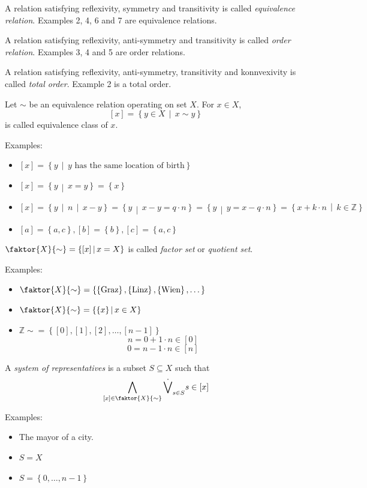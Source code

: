 \documentclass[a4paper,landscape,twocolumn]{article}
\newcommand\set[1]{\left\{#1\right\}}
\newcommand\setdef[2]{\left\{#1\,\middle|\,#2\right\}}
\newcommand\divides[2]{#1\,\mid\,#2}
\begin{document}
A relation satisfying reflexivity, symmetry and transitivity is called \emph{equivalence relation}.
Examples 2, 4, 6 and 7 are equivalence relations.

A relation satisfying reflexivity, anti-symmetry and transitivity is called \emph{order relation}.
Examples 3, 4 and 5 are order relations.

A relation satisfying reflexivity, anti-symmetry, transitivity and konnvexivity is called \emph{total order}.
Example 2 is a total order.

Let $\sim$ be an equivalence relation operating on set $X$.
For $x \in X$,
\[ [x] = \setdef{y \in X}{x \sim y} \]
is called equivalence class of $x$.

Examples:
\begin{itemize}
  \item $[x] = \setdef{y}{y \text{ has the same location of birth}}$
  \item $[x] = \setdef{y}{x = y} = \set{x}$
  \item $[x] = \setdef{y}{\divides{n}{x - y}} = \setdef{y}{x - y = q\cdot n} = \setdef{y}{y = x - q \cdot n} = \setdef{x + k \cdot n}{k \in \mathbb{Z}}$
  \item $[a] = \set{a, c}, [b] = \set{b}, [c] = \set{a, c}$
\end{itemize}

$\faktor{X}{\sim} = \setdef{[x]}{x = X}$ is called \emph{factor set} or \emph{quotient set}.

Examples:
\begin{itemize}
  \item $\faktor{X}{\sim} = \set{\set{\text{Graz}}, \set{\text{Linz}}, \set{\text{Wien}}, \dots}$
  \item $\faktor{X}{\sim} = \setdef{\set{x}}{x \in X}$
  \item $\mathbb{Z}{\sim} = \set{[0], [1], [2], \ldots, [n-1]}$
     \[ n = 0 + 1 \cdot n \in [0] \]
     \[ 0 = n - 1 \cdot n \in [n] \]
\end{itemize}

A \emph{system of representatives} is a subset $S \subseteq X$ such that
\[ \bigwedge_{[x] \in \faktor{X}{\sim}} \dot\bigvee_{s \in S} s \in [x] \]

Examples:
\begin{itemize}
  \item The mayor of a city.
  \item $S = X$
  \item $S = \set{0, \ldots, n - 1}$
\end{itemize}
\end{document}
